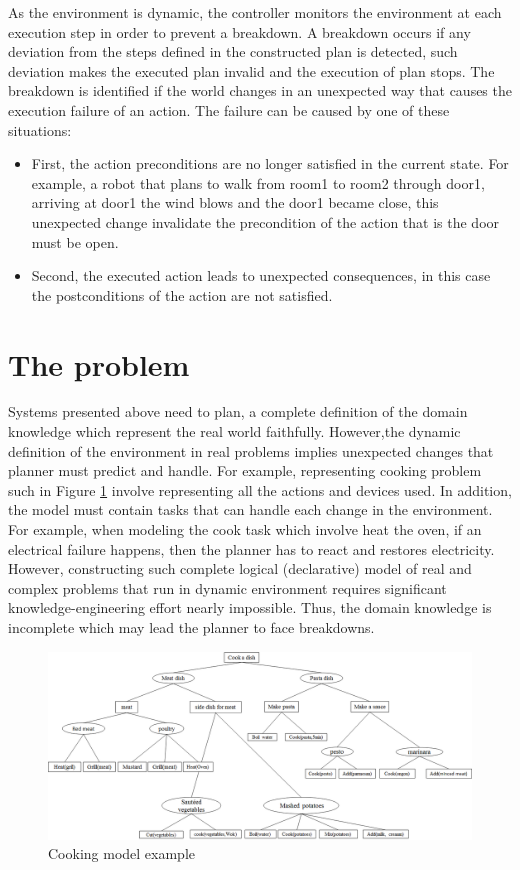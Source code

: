\par As the environment is dynamic, the controller monitors the environment at each execution step in order to prevent a breakdown. A breakdown occurs if any deviation from the steps defined in the constructed plan is detected, such deviation makes the executed plan invalid and the execution of plan stops. The breakdown
is identified if the world changes in an unexpected way that causes the execution failure of an action. The failure can be caused by one of these situations:
\begin{itemize}
	\item First, the action preconditions are no longer satisfied in the current state. For example, a robot that plans to walk from room1 to room2 through door1, arriving at door1 the wind blows and the door1 became close, this unexpected change invalidate the precondition of the action that is the door must be open.
	\item Second, the executed action leads to unexpected consequences, in this case the postconditions of the action are not satisfied.
\end{itemize}
%
\section{The problem}

Systems presented above need to plan, a complete definition of the domain knowledge which represent the real world faithfully. However,the dynamic definition of the environment in real problems implies unexpected changes that planner must predict and handle. For example, representing cooking problem such in Figure \ref{Cooking model example} involve representing all the actions and devices used. In addition, the model must contain tasks that can handle each change in the environment. For example, when modeling the cook task which involve heat the oven, if an electrical failure happens, then the planner has to react and restores electricity. However,  constructing such complete logical (declarative) model of real and complex problems that run in dynamic environment requires significant knowledge-engineering effort nearly impossible.  Thus, the domain knowledge is  incomplete which may lead the planner to face breakdowns. 
 \begin{figure}[h]
 	\centering
 	\includegraphics[width=\textwidth]{Pictures/cooking.png}
 	\caption{\label{Cooking model example} Cooking model example}
 \end{figure}
 

